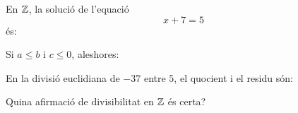 \begin{enumerate}
\pregunta En \(\mathbb{Z}\), la solució de l'equació
\[
x+7=5
\]
és:
\begin{enumerate}
\end{enumerate}
\feedback

\pregunta Si \(a\leq b\) i \(c\leq 0\), aleshores:
\begin{enumerate}
\end{enumerate}
\feedback

\pregunta En la divisió euclidiana de \(-37\) entre \(5\), el quocient i el residu són:
\begin{enumerate}
\end{enumerate}
\feedback

\pregunta Quina afirmació de divisibilitat en \(\mathbb{Z}\) és certa?
\begin{enumerate}
\end{enumerate}
\feedback

\end{enumerate}


